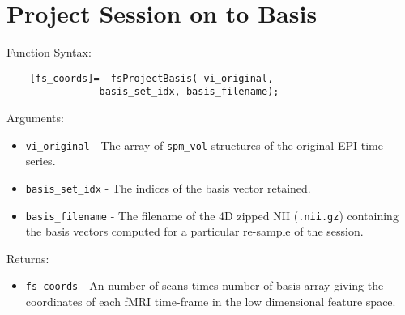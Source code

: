 \section{Project Session on to Basis}
Function Syntax:
\begin{verbatim}
    [fs_coords]=  fsProjectBasis( vi_original,
                basis_set_idx, basis_filename);
\end{verbatim}
Arguments:
\begin{itemize}
    \item \verb"vi_original" - The array of \verb"spm_vol" structures of the original EPI time-series.
 \item \verb"basis_set_idx" -
   The indices of the basis vector retained.
  \item \verb"basis_filename" -
    The filename of the 4D zipped NII (\verb".nii.gz")
    containing the basis vectors computed for a particular re-sample of the
    session.
\end{itemize}
Returns:
\begin{itemize}
  \item \verb"fs_coords" - An number of scans times number of basis
  array giving the coordinates of each fMRI time-frame in the low
  dimensional feature space.
\end{itemize}
